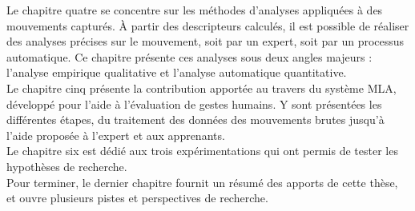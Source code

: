 Le chapitre quatre se concentre sur les méthodes d'analyses appliquées à des mouvements capturés. À partir des descripteurs calculés, il est possible de réaliser des analyses précises sur le mouvement, soit par un expert, soit par un processus automatique. Ce chapitre présente ces analyses sous deux angles majeurs : l'analyse empirique qualitative et l'analyse automatique quantitative.\\

Le chapitre cinq présente la contribution apportée au travers du système MLA, développé pour l'aide à l'évaluation de gestes humains. Y sont présentées les différentes étapes, du traitement des données des mouvements brutes jusqu'à l'aide proposée à l'expert et aux apprenants.\\

Le chapitre six est dédié aux trois expérimentations qui ont permis de tester les hypothèses de recherche.\\

Pour terminer, le dernier chapitre fournit un résumé des apports de cette thèse, et ouvre plusieurs pistes et perspectives de recherche.

